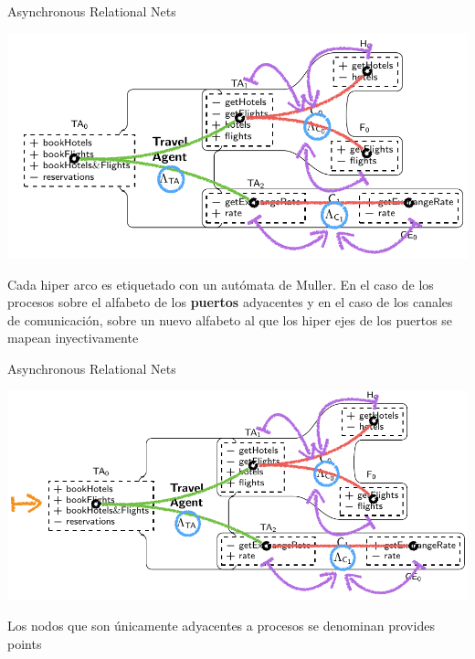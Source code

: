 \documentclass[10pt,xcolor={table,dvipsnames},t]{beamer}
\begin{document}
\begin{frame}{Asynchronous Relational Nets \cite{fiadeiro:fase2011}}
\begin{center}
\includegraphics[scale=0.5]{images/ARN2.png}
\end{center}
Cada hiper arco es etiquetado con un \textcolor{muller}{autómata de Muller}. En el caso de los \textcolor{proc}{procesos} sobre el alfabeto de los \textbf{puertos} adyacentes y en el caso de los \textcolor{com}{canales de comunicación}, sobre un nuevo alfabeto al que los hiper ejes de los puertos se \textcolor{map}{mapean inyectivamente}  
\end{frame}

\begin{frame}{Asynchronous Relational Nets \cite{fiadeiro:fase2011}}
\begin{center}
\includegraphics[scale=0.5]{images/ARN3.png}
\end{center}
Los nodos que son únicamente adyacentes a \textcolor{proc}{procesos} se denominan \textcolor{prov}{provides points}  
\end{frame}
\end{document}

